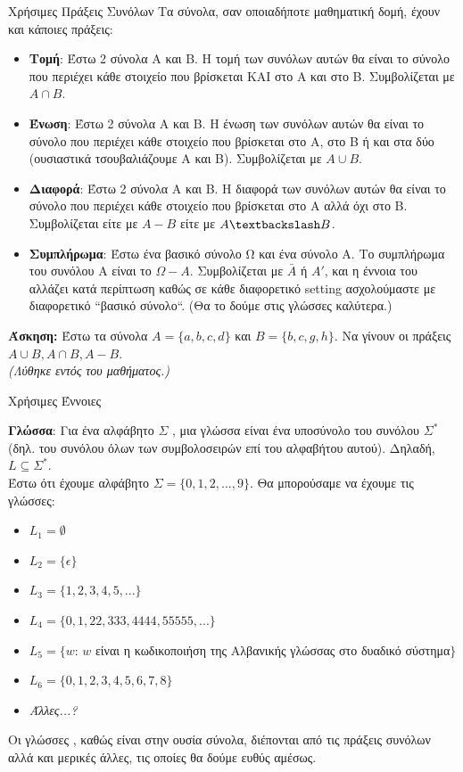 \documentclass[size=14pt, paper=smartboard, style=fyma, mode=present]{powerdot}
\begin{document}
\begin{slide}[toc=]{Χρήσιμες Πράξεις Συνόλων}
	Τα σύνολα, σαν οποιαδήποτε μαθηματική δομή, έχουν και κάποιες πράξεις: \pause
	\begin{itemize}
		\item \textbf{Τομή}: Έστω 2 σύνολα Α και Β. Η τομή των συνόλων αυτών θα είναι το σύνολο που περιέχει κάθε στοιχείο που βρίσκεται ΚΑΙ στο Α και στο Β. Συμβολίζεται με $A \cap B$. \pause
		\item \textbf{Ένωση}:  Έστω 2 σύνολα Α και Β. Η ένωση των συνόλων αυτών θα είναι το σύνολο που περιέχει κάθε στοιχείο που βρίσκεται στο Α, στο Β ή και στα δύο (ουσιαστικά τσουβαλιάζουμε Α και Β). Συμβολίζεται με $A \cup B$. \pause
		\item \textbf{Διαφορά}:  Έστω 2 σύνολα Α και Β. Η διαφορά των συνόλων αυτών θα είναι το σύνολο που περιέχει κάθε στοιχείο που βρίσκεται στο Α αλλά όχι στο Β. Συμβολίζεται είτε με $A - B$ είτε με $A \textbackslash B$. \pause
		\item \textbf{Συμπλήρωμα}: Έστω ένα βασικό σύνολο Ω και ένα σύνολο Α. Το συμπλήρωμα του συνόλου Α είναι το $\Omega - A$. Συμβολίζεται με $\bar{A}$ ή $A'$, και η έννοια του αλλάζει κατά περίπτωση καθώς σε κάθε διαφορετικό \textlatin{setting} ασχολούμαστε με διαφορετικό ``βασικό σύνολο``. (Θα το δούμε στις γλώσσες καλύτερα.)
	\end{itemize} \pause 
\textbf{Άσκηση:} Έστω τα σύνολα $Α = \{a,b,c,d\}$ και $B= \{b,c,g,h\}$. Να γίνουν οι πράξεις $A\cup B, A \cap B, A - B$.
\\
\textit{(Λύθηκε εντός του μαθήματος.)}
\end{slide}
\begin{slide}[toc={Έννοιες στη Θεωρία Υπολογισμού ΙΙΙ}]{Χρήσιμες Έννοιες}
{\large
	 \textbf{Γλώσσα}: Για ένα αλφάβητο $\Sigma$ , μια γλώσσα είναι ένα υποσύνολο του συνόλου $\Sigma^*$ (δηλ. του συνόλου όλων των συμβολοσειρών επί του αλφαβήτου αυτού). Δηλαδή, $ L \subseteq \Sigma^*$. 
	 \\
	 Έστω ότι έχουμε αλφάβητο $\Sigma = \{0,1,2,...,9\}$. Θα μπορούσαμε να έχουμε τις γλώσσες:
	 \begin{itemize}
	 	\item $L_1 = \emptyset$
	 	\item $L_2 = \{\epsilon\}$
	 	\item $L_3 = \{1,2,3,4,5,...\}$
	 	\item $L_4 = \{0,1,22,333,4444,55555,...\}$
	 	\item $L_5 = \{w$: $w$ είναι η κωδικοποιήση της Αλβανικής γλώσσας στο δυαδικό σύστημα$ \}$
	 	\item $L_6 = \{0,1,2,3,4,5,6,7,8\}$ 
	 	\item \textit{Άλλες...?}
	 	\end{itemize}
	 Οι γλώσσες , καθώς είναι στην ουσία σύνολα, διέπονται από τις πράξεις συνόλων αλλά και μερικές άλλες, τις οποίες θα δούμε ευθύς αμέσως.
}
\end{slide}
\end{document}
